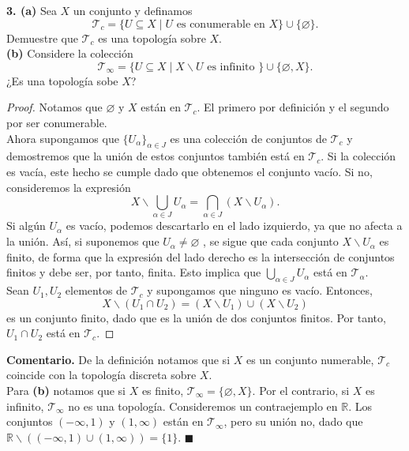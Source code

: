\documentclass{article}
\begin{document}
\begin{mybox}
	\textbf{3. (a)} Sea $X$ un conjunto y definamos 
	$$ \mathcal{T}_{c} =\{ U \subseteq X \mid U \text{ es conumerable en }X \} \cup \{\varnothing \}. $$
	Demuestre que $\mathcal{T}_{c}$ es una topología sobre $X$. \\

	\textbf{(b)} Considere la colección 
	$$ \mathcal{T}_{\infty} = \{ U \subseteq X \mid X \backslash U \text{ es infinito } \} \cup \{ \varnothing, X \}. $$
¿Es una topología sobe $X$?
\end{mybox}	

\begin{proof}
	Notamos que $\varnothing$ y $X$ están en $\mathcal{T}_{c}$. El primero por definición y el segundo por ser conumerable. \\
	Ahora supongamos que $\{ U_{\alpha}\}_{\alpha \in J}$ es una colección de conjuntos de $\mathcal{T}_{c}$ y demostremos que la unión de estos conjuntos también está en $\mathcal{T}_{c}$. Si la colección es vacía, este hecho se cumple dado que obtenemos el conjunto vacío. Si no, consideremos la expresión
	$$ X \backslash \bigcup_{\alpha \in J} U_{\alpha} = \bigcap_{\alpha \in J} (X \backslash U_{\alpha}). $$ 
	Si algún $U_{\alpha}$ es vacío, podemos descartarlo en el lado izquierdo, ya que no afecta a la unión. Así, si suponemos que $U_{\alpha} \neq \varnothing$ , se sigue que cada conjunto $X \backslash U_{\alpha}$ es finito, de forma que la expresión del lado derecho es la intersección de conjuntos finitos y debe ser, por tanto, finita. Esto implica que $\bigcup_{\alpha \in J} U_{\alpha}$ está en $\mathcal{T}_{\alpha}$.\\
	Sean $U_{1}, U_{2}$ elementos de $\mathcal{T}_{c}$ y supongamos que ninguno es vacío. Entonces,
	$$ X \backslash (U_{1} \cap U_{2}) = (X \backslash U_{1}) \cup (X \backslash U_{2}) $$
	es un conjunto finito, dado que es la unión de dos conjuntos finitos. Por tanto, $U_{1} \cap U_{2}$ está en $\mathcal{T}_{c}$.
\end{proof} 
\textbf{Comentario. } De la definición notamos que si $X$ es un conjunto numerable, $\mathcal{T}_{c}$ coincide con la topología discreta sobre $X$.\\

Para \textbf{(b)} notamos que si $X$ es finito, $\mathcal{T}_{\infty} = \{ \varnothing, X \}$. Por el contrario, si $X$ es infinito, $\mathcal{T}_{\infty}$ no es una topología. Consideremos un contraejemplo en $\mathbb{R}$. Los conjuntos $(-\infty, 1)$ y $(1, \infty )$ están en $\mathcal{T}_{\infty}$, pero su unión no, dado que $\mathbb{R} \backslash ( (- \infty, 1) \cup (1, \infty) ) = \{ 1 \}$. \hspace{7cm} $\blacksquare$
\vspace{0.5cm}
\end{document}
